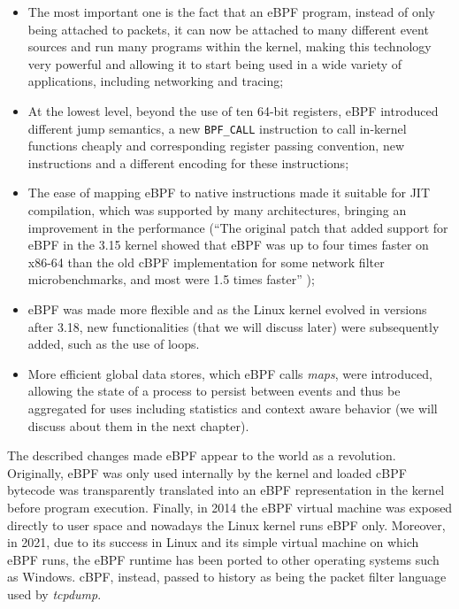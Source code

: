 \begin{itemize}
	\item 
		The most important one is the fact that an eBPF program, instead of only being attached to packets, it can now be attached to many different event sources and run many programs within the kernel, making this technology very powerful and allowing it to start being used in a wide variety of applications, including networking and tracing;
	\item 
		At the lowest level, beyond the use of ten 64-bit registers, eBPF introduced different jump semantics, a new \colorbox{backcolour}{\lstinline[style=cstyle, language=C]|BPF_CALL|} instruction to call in-kernel functions cheaply and corresponding register passing convention, new instructions and a different encoding for these instructions;
	\item 
		The ease of mapping eBPF to native instructions made it suitable for JIT compilation, which was supported by many architectures, bringing an improvement in the performance (``The original patch that added support for eBPF in the 3.15 kernel showed that eBPF was up to four times faster on x86-64 than the old cBPF implementation for some network filter microbenchmarks, and most were 1.5 times faster'' \cite{eBPFThroughIntroduction});
	\item 
		eBPF was made more flexible and as the Linux kernel evolved in versions after 3.18, new functionalities (that we will discuss later) were subsequently added, such as the use of loops.
	\item 
		More efficient global data stores, which eBPF calls \textit{maps}, were introduced, allowing the state of a process to persist between events and thus be aggregated for uses including statistics and context aware behavior (we will discuss about them in the next chapter).
\end{itemize}

The described changes made eBPF appear to the world as a revolution.
Originally, eBPF was only used internally by the kernel and loaded cBPF bytecode was transparently translated into an eBPF representation in the kernel before program execution.
Finally, in 2014 the eBPF virtual machine was exposed directly to user space and nowadays the Linux kernel runs eBPF only.
Moreover, in 2021, due to its success in Linux and its simple virtual machine on which eBPF runs, the eBPF runtime has been ported to other operating systems such as Windows.
cBPF, instead, passed to history as being the packet filter language used by \textit{tcpdump}.

